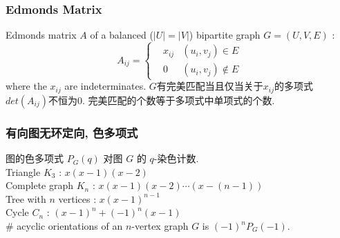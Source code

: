     \subsubsection{Edmonds Matrix}
        Edmonds matrix $A$ of a balanced ($|U|=|V|$) bipartite graph $G=(U,V,E)$ : 
        \[A_{ij}=\left\{
            \begin{aligned}
                & x_{ij} & (u_i,v_j)\in E\\
                & 0 & (u_i,v_j)\notin E
            \end{aligned}
            \right.\]
        where the $x_{ij}$ are indeterminates. $G$有完美匹配当且仅当关于$x_{ij}$的多项式$det(A_{ij})$不恒为$0$.
        完美匹配的个数等于多项式中单项式的个数.
\subsubsection{有向图无环定向, 色多项式}
    \noindent
    图的色多项式 $P_G(q)$ 对图 $G$ 的 $q$-染色计数.\\
    Triangle $K_3$ : $x(x-1)(x-2)$\\
    Complete graph $K_n$ : $x(x-1)(x-2)\cdots (x-(n-1))$\\
    Tree with $n$ vertices : $x(x-1)^{n-1}$\\
    Cycle $C_n$ : $(x-1)^{n}+(-1)^{n}(x-1)$\\
    \# acyclic orientations of an $n$-vertex graph $G$ is $(-1)^nP_G(-1)$.
